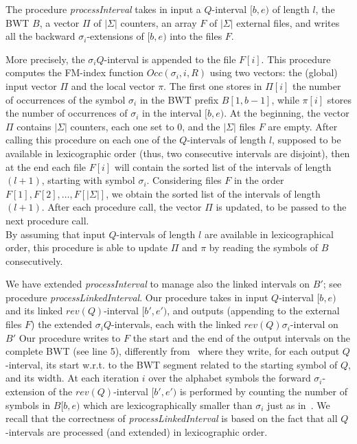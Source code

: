 \documentclass[runningheads,envcountsame,a4paper]{llncs}
\newcommand{\notaestesa}[2]{%
  {\sffamily {\bfseries #1}{\footnotesize #2}}%
  \marginpar{\framebox{\Large *}}%
}
\newcommand{\wrt}{w.r.t.\xspace}
\begin{document}
The procedure \emph{processInterval} takes in input a $Q$-interval $[b,e)$ of
length $l$, the BWT $B$, a vector $\Pi$ of $|\Sigma|$ counters, an array $F$ of
$|\Sigma|$ external files, and writes all the backward $\sigma_i$-extensions of
$[b,e)$ into the files $F$.\notaestesa{GDV}{ perchè non ho il file $F(\$)$?}
More precisely, the $\sigma_i Q$-interval is appended to the file $F[i]$.
This procedure computes the FM-index function $Occ(\sigma_i, i, R)$ using two
vectors: the (global) input vector $\Pi$ and the local vector $\pi$.
The first one stores in $\Pi[i]$ the number of occurrences of  the symbol
$\sigma_i$ in the BWT prefix $B[1,b-1]$, \notaestesa{GDV}{ ovvero
  $Occ(\sigma_{i}, b)$} while $\pi[i]$ stores the number of occurrences of $\sigma_i$ in the interval $[b,e)$. At the beginning, the vector $\Pi$ contains $|\Sigma|$ counters, each one set to $0$, and the $|\Sigma|$ files $F$ are empty.
After calling this procedure on each one of the $Q$-intervals of length $l$, supposed to be available in lexicographic order (thus, two consecutive intervals are disjoint), then  at the end each file $F[i]$ will contain the sorted list of the intervals of length $(l+1)$, starting with symbol $\sigma_i$. Considering files $F$ in the order $F[1], F[2], \ldots ,F[|\Sigma|]$, we obtain the sorted list of the intervals of length $(l+1)$. After each procedure call, the vector $\Pi$ is updated, to be passed to the next procedure call.\\
By assuming that input $Q$-intervals of length $l$ are available in lexicographical order, this procedure is able to update $\Pi$ and $\pi$ by reading the symbols of $B$ consecutively.

We have extended \emph{processInterval} to manage also the linked intervals on
$B'$; see procedure \emph{processLinkedInterval}.
Our procedure takes in input $Q$-interval $[b,e)$ and its linked
$rev(Q)$-interval $[b',e')$, and outputs (appending to the external files $F$)
the extended $\sigma_i Q$-intervals, each  with the linked $rev(Q)
\sigma_i$-interval on $B'$
Our procedure writes to $F$ the start and the end of the output intervals on the
complete BWT (see line 5), differently from~\cite{Cox2012} where they write, for each output $Q$-interval, its start \wrt to the BWT segment related to the starting symbol of $Q$, and its width.
At each iteration $i$ over the alphabet symbols the forward $\sigma_i$-extension
of the $rev(Q)$-interval $[b',e')$ is performed by counting
the number of symbols in $B[b,e)$ which are lexicographically smaller than
$\sigma_i$ just as in~\cite{Simpson2010}.
We recall that the correctness of \emph{processLinkedInterval} is based on the
fact that all $Q$-intervals are processed (and extended) in lexicographic order.
\end{document}
